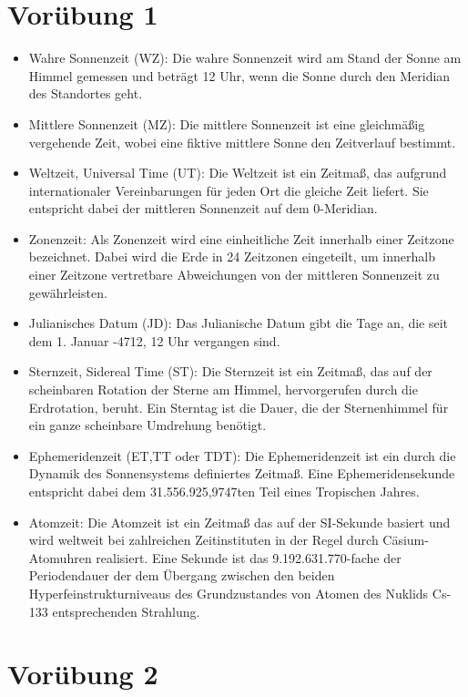\documentclass[titlepage]{scrartcl}
\begin{document}
\section{Vorübung 1}

\begin{itemize}
\item Wahre Sonnenzeit (WZ): Die wahre Sonnenzeit wird am Stand der Sonne am Himmel gemessen und beträgt 12 Uhr, wenn die Sonne durch den Meridian des Standortes geht.
\item Mittlere Sonnenzeit (MZ): Die mittlere Sonnenzeit ist eine gleichmäßig vergehende Zeit, wobei eine fiktive mittlere Sonne den Zeitverlauf bestimmt.
\item Weltzeit, Universal Time (UT): Die Weltzeit ist ein Zeitmaß, das aufgrund internationaler Vereinbarungen für jeden Ort die gleiche Zeit liefert. Sie entspricht dabei der mittleren Sonnenzeit auf dem 0-Meridian.
\item Zonenzeit: Als Zonenzeit wird eine einheitliche Zeit innerhalb einer Zeitzone bezeichnet. Dabei wird die Erde in 24 Zeitzonen eingeteilt, um innerhalb einer Zeitzone vertretbare Abweichungen von der mittleren Sonnenzeit zu gewährleisten.
\item Julianisches Datum (JD): Das Julianische Datum gibt die Tage an, die seit dem 1. Januar -4712, 12 Uhr vergangen sind.
\item Sternzeit, Sidereal Time (ST): Die Sternzeit ist ein Zeitmaß, das auf der scheinbaren Rotation der Sterne am Himmel, hervorgerufen durch die Erdrotation, beruht. Ein Sterntag ist die Dauer, die der Sternenhimmel für ein ganze scheinbare Umdrehung benötigt.
\item Ephemeridenzeit (ET,TT oder TDT): Die Ephemeridenzeit ist ein durch die Dynamik des Sonnensystems definiertes Zeitmaß. Eine Ephemeridensekunde entspricht dabei dem 31.556.925,9747ten Teil eines Tropischen Jahres. 
\item Atomzeit: Die Atomzeit ist ein Zeitmaß das auf der SI-Sekunde basiert und wird weltweit bei zahlreichen Zeitinstituten in der Regel durch Cäsium-Atomuhren realisiert. Eine Sekunde ist das 9.192.631.770-fache der Periodendauer der dem Übergang zwischen den beiden Hyperfeinstrukturniveaus des Grundzustandes von Atomen des Nuklids Cs-133 entsprechenden Strahlung.
\end{itemize}

\section{Vorübung 2}
\end{document}
